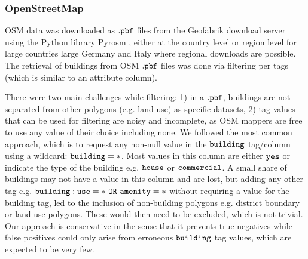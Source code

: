 \documentclass[fleqn,10pt]{wlscirep}
\begin{document}
\subsubsection*{OpenStreetMap}

OSM data was downloaded as $\tt{.pbf}$ files from the Geofabrik download server \cite{geofabrik_2018} using the Python library Pyrosm \cite{pyrosm_2021}, either at the country level or region level for large countries large Germany and Italy where regional downloads are possible. The retrieval of buildings from OSM $\tt{.pbf}$ files was done via filtering per tags (which is similar to an attribute column). 

There were two main challenges while filtering: 1) in a $\tt{.pbf}$, buildings are not separated from other polygons (e.g. land use) as specific datasets, 2) tag values that can be used for filtering are noisy and incomplete, as OSM mappers are free to use any value of their choice including none. We followed the most common approach, which is to request any non-null value in the $\tt{building}$ tag/column using a wildcard: $\tt{building=*}$. Most values in this column are either $\tt{yes}$ or indicate the type of the building e.g. $\tt{house}$ or $\tt{commercial}$. A small share of buildings may not have a value in this column and are lost, but adding any other tag e.g. $\tt{building:use=* \ OR \ amenity=*}$ without requiring a value for the building tag, led to the inclusion of non-building polygons e.g. district boundary or land use polygons. These would then need to be excluded, which is not trivial. Our approach is conservative in the sense that it prevents true negatives while false positives could only arise from erroneous $\tt{building}$ tag values, which are expected to be very few.     
\end{document}
